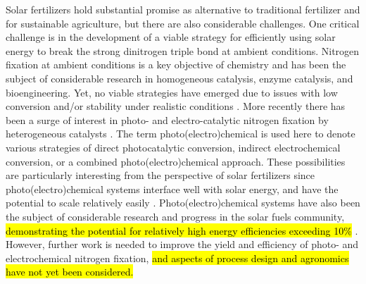 Solar fertilizers hold substantial promise as alternative to traditional fertilizer and for sustainable agriculture, but there are also considerable challenges. One critical challenge is in the development of a viable strategy for efficiently using solar energy to break the strong dinitrogen triple bond at ambient conditions. Nitrogen fixation at ambient conditions is a key objective of chemistry and has been the subject of considerable research in homogeneous catalysis, enzyme catalysis, and bioengineering. Yet, no viable strategies have emerged due to issues with low conversion and/or stability under realistic conditions \cite{Vicente_2017,Bur_n_2017,MacLeod_2013,Foster2018}.
More recently there has been a surge of interest in photo- and electro-catalytic nitrogen fixation by heterogeneous catalysts \cite{Jewess_2016, Medford_2017,Kyriakou_2017,Foster_2018,Chen_2018,Tao_2019,Song_2019,Luo_2018,Wang_2018}. The term photo(electro)chemical is used here to denote various strategies of direct photocatalytic conversion, indirect electrochemical conversion, or a combined photo(electro)chemical approach. These possibilities are particularly interesting from the perspective of solar fertilizers since photo(electro)chemical systems interface well with solar energy, and have the potential to scale relatively easily \cite{Jewess_2016}. Photo(electro)chemical systems have also been the subject of considerable research and progress in the solar fuels community, \hl{demonstrating the potential for relatively high energy efficiencies exceeding 10\%} \cite{walter_2010, Pinaud_2013,Kondratenko2013,Shaner_2016, Lewis_2016, Montoya_2017}. However, further work is needed to improve the yield and efficiency of photo- and electrochemical nitrogen fixation, \hl{and aspects of process design and agronomics have not yet been considered.} %

